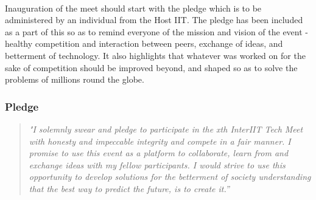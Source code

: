 
\paragraph{}
Inauguration of the meet should start with the pledge which is to be administered by an individual from the Host IIT. The pledge has been included as a part of this so as to remind everyone of the mission and vision of the event - healthy competition and interaction between peers, exchange of ideas, and betterment of technology. It also highlights that whatever was worked on for the sake of competition should be improved beyond, and shaped so as to solve the problems of millions round the globe.

\subsubsection{Pledge}
\begin{quote}
    \textit{"I solemnly swear and pledge to participate in the xth InterIIT Tech Meet with honesty and impeccable integrity and compete in a fair manner. I promise to use this event as a platform to collaborate, learn from and exchange ideas with my fellow participants. I would strive to use this opportunity to develop solutions for the betterment of society understanding that the best way to predict the future, is to create it.”}
\end{quote}
